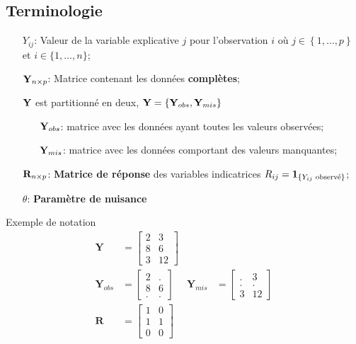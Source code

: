 \documentclass[10pt, french]{article}
\begin{document}
\begin{multicols*}{3}
\subsection*{Terminologie}

\begin{definition}[Notation]
\begin{itemize}
	\item[$Y_{ij}$:] Valeur de la variable explicative $j$ pour l'observation $i$ où	$j \in \left\{ 1, \dots, p \right\}$ et $i \in \{1, \dots, n\}$;
	\item[$\mathbf{Y}_{n \times p}$:] Matrice contenant les données \textbf{complètes};
	\item[]	$\mathbf{Y}$ est partitionné en deux, $\mathbf{Y} = \left\{ \mathbf{Y}_{obs}, \mathbf{Y}_{mis} \right\}$
		\begin{itemize}
		\item[$\mathbf{Y}_{obs}$:] matrice avec les données ayant toutes les valeurs observées;
		\item[$\mathbf{Y}_{mis}$:] matrice avec les données comportant des valeurs manquantes;
		\end{itemize}
	\item[$\mathbf{R}_{n \times p}$:]	\textbf{Matrice de réponse} des variables indicatrices $R_{ij} = \mathbf{1}_{\{Y_{ij} \text{ observé}\}}$;
	\item[$\theta$:] \textbf{Paramètre de nuisance}
\end{itemize}
\end{definition}

\begin{examplebox}{Exemple de notation}
\begin{align*}
	\bm{Y}	
	&=	\begin{bmatrix}
		2	&	3	\\
		8	&	6	\\
		3	&	12	
		\end{bmatrix}	\\
	\bm{Y}_{obs}
	&=	\begin{bmatrix}
		2	&	.	\\
		8	&	6	\\
		.	&	.
		\end{bmatrix}	&
	\bm{Y}_{mis}
	&=	\begin{bmatrix}
		.	&	3	\\
		.	&	.	\\
		3	&	12	
		\end{bmatrix}	\\
	\bm{R}
	&=	\begin{bmatrix}
		1	&	0	\\
		1	&	1	\\
		0	&	0	
		\end{bmatrix}	
\end{align*}
\end{examplebox}


\end{multicols*}
\end{document}
